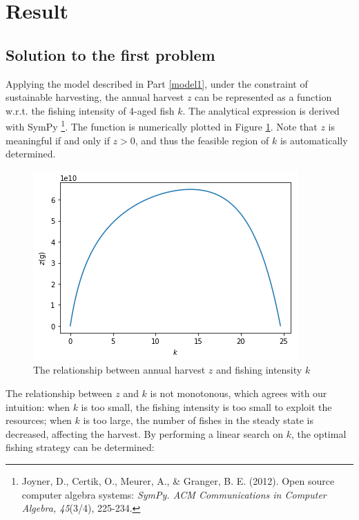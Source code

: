 \documentclass{IEEEtran}
\begin{document}
\section{Result}

\subsection{Solution to the first problem}\label{result1}

Applying the model described in Part \ref{model1}, under the constraint of sustainable harvesting, the annual harvest $z$ can be represented as a function w.r.t. the fishing intensity of 4-aged fish $k$. The analytical expression is derived with SymPy \footnote{Joyner, D., Certik, O., Meurer, A., \& Granger, B. E. (2012). Open source computer algebra systems: \textit{SymPy. ACM Communications in Computer Algebra, 45}(3/4), 225-234.}. The function is numerically plotted in Figure \ref{plot1}. Note that $z$ is meaningful if and only if $z>0$, and thus the feasible region of $k$ is automatically determined.

\begin{figure}[h]
	\centering
	\includegraphics[width=\columnwidth]{plot1}
	\caption{The relationship between annual harvest $z$ and fishing intensity $k$\label{plot1}}
\end{figure}

The relationship between $z$ and $k$ is not monotonous, which agrees with our intuition: when $k$ is too small, the fishing intensity is too small to exploit the resources; when $k$ is too large, the number of fishes in the steady state is decreased, affecting the harvest. By performing a linear search on $k$, the optimal fishing strategy can be determined:
\end{document}
